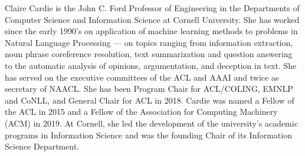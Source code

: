 Claire Cardie is the John C. Ford Professor of Engineering in the Departments of Computer
Science and Information Science at Cornell University. She has worked since the early 1990’s on
application of machine learning methods to problems in Natural Language Processing — on topics
ranging from information extraction, noun phrase coreference resolution, text summarization and
question answering to the automatic analysis of opinions, argumentation, and deception in text. She
has served on the executive committees of the ACL and AAAI and twice as secretary of NAACL.
She has been Program Chair for ACL/COLING, EMNLP and CoNLL, and General Chair for ACL in
2018. Cardie was named a Fellow of the ACL in 2015 and a Fellow of the Association for Computing
Machinery (ACM) in 2019. At Cornell, she led the development of the university’s academic programs
in Information Science and was the founding Chair of its Information Science Department.
